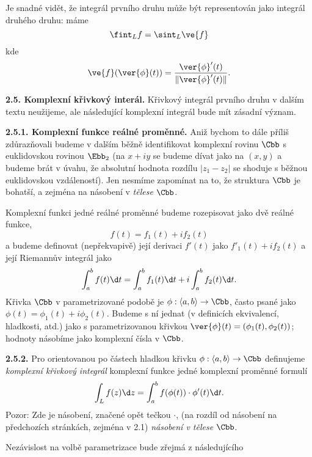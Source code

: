 \documentclass[12pt]{article}
\begin{document}
\smallskip

Je snadné vidět, že integrál prvního druhu může být representován jako integrál druhého druhu: máme
$$
\fint_Lf=\sint_L\ve{f}
$$
kde
$$
\ve{f}(\ver{\phi}(t))=\frac{\ver{\phi}'(t)}{\|\ver{\phi}'(t)\|}.
$$

\bigskip

{\bf 2.5. Komplexní křivkový interál.} Křivkový integrál prvního druhu v dalším textu neužijeme, ale následující komplexní integrál bude mít zásadní význam.

\medskip

{\bf 2.5.1. Komplexní funkce reálné proměnné.} Aniž bychom to dále příliš zdůrazňovali budeme v dalším běžně identifikovat komplexní rovinu $\Cbb$ s euklidovskou rovinou
 $\Ebb_2$ (na $x+iy$ se budeme dívat jako na $(x,y)$ a budeme brát v úvahu, že absolutní hodnota rozdílu
 $|z_1-z_2|$ se shoduje s běžnou euklidovskou vzdáleností). Jen nesmíme zapomínat na to, že struktura $\Cbb$ je bohatší, a zejména na násobení v  {\em tělese} $\Cbb$.

Komplexní funkci jedné reálné proměnné budeme rozepisovat jako dvě reálné funkce,
$$
f(t)=f_1(t)+i f_2(t)
$$
a budeme definovat (nepřekvapivě) její derivaci $f'(t)$ jako $f'_1(t)+if_2(t)$  a její Riemannův integrál jako
$$
\int_a^bf(t)\d t=\int_a^bf_1(t)\d t+i\int_a^bf_2(t)\d t.
$$ 
Křivka $\Cbb$ v parametrizované podobě je $\phi:\langle a,b\rangle\to\Cbb$, často psané jako  $\phi(t)=\phi_1(t)+i\phi_2(t)$. Budeme s ní jednat
  (v definicích ekvivalencí, hladkosti, atd.) jako s parametrizovanou křivkou $\ver{\phi}(t)=(\phi_1(t),\phi_2(t))$;  hodnoty  násobíme jako komplexní čísla v $\Cbb$.

\medskip

{\bf 2.5.2.} Pro orientovanou po částech hladkou křivku $\phi:\langle a,b\rangle\to\Cbb$ definujeme {\em komplexní křivkový integrál} komplexní funkce jedné komplexní proměnné formulí
$$
\int_Lf(z)\d z=\int_a^bf(\phi(t))\cdot\phi'(t)\d t.
$$
Pozor: Zde je násobení, značené opět tečkou $\cdot$, (na rozdíl od násobení na předchozích stránkách, zejména v 2.1) {\em násobení v tělese} $\Cbb$.

\smallskip

Nezávislost na volbě parametrizace bude zřejmá z následujícího 

\medskip
\end{document}
